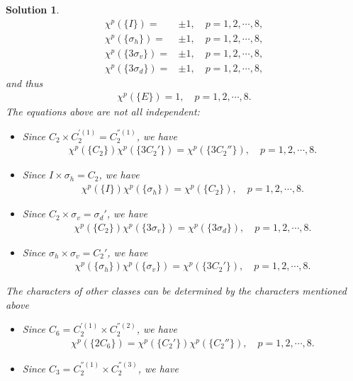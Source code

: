 \documentclass[UTF8,10pt,a4paper]{article}
\theoremstyle{Problem}
\theoremstyle{Solution}
\newtheorem*{sol}{Solution}
\begin{document}
\begin{sol}
\begin{align}
        \chi^p(\{I\})=&\pm 1,\quad p=1,2,\cdots,8,\\
        \chi^p(\{\sigma_h\})=&\pm 1,\quad p=1,2,\cdots,8,\\
        \chi^p(\{3\sigma_v\})=&\pm 1,\quad p=1,2,\cdots,8,\\
        \chi^p(\{3\sigma_d\})=&\pm 1,\quad p=1,2,\cdots,8,
    \end{align}
    and thus
    \begin{align}
        \chi^p(\{E\})=1,\quad p=1,2,\cdots,8.
    \end{align}
    The equations above are not all independent:
    \begin{itemize}
        \item Since $C_2\times C_2^{'(1)}=C_2^{''(1)}$, we have
        \begin{align}
            \chi^p(\{C_2\})\chi^p(\{3C_2'\})=\chi^p(\{3C_2''\}),\quad p=1,2,\cdots,8.
        \end{align}
        \item Since $I\times \sigma_h=C_2$, we have
        \begin{align}
            \chi^p(\{I\})\chi^p(\{\sigma_h\})=\chi^p(\{C_2\}),\quad p=1,2,\cdots,8.
        \end{align}
        \item Since $C_2\times\sigma_v=\sigma_d'$, we have
        \begin{align}
            \chi^p(\{C_2\})\chi^p(\{3\sigma_v\})=\chi^p(\{3\sigma_d\}),\quad p=1,2,\cdots,8.
        \end{align}
        \item Since $\sigma_h\times\sigma_v=C_2'$, we have
        \begin{align}
            \chi^p(\{\sigma_h\})\chi^p(\{\sigma_v\})=\chi^p(\{3C_2'\}),\quad p=1,2,\cdots,8.
        \end{align}
    \end{itemize}
    The characters of other classes can be determined by the characters mentioned above
    \begin{itemize}
        \item Since $C_6=C_2^{'(1)}\times C_2^{''(2)}$, we have
        \begin{align}
            \chi^p(\{2C_6\})=\chi^p(\{C_2'\})\chi^p(\{C_2''\}),\quad p=1,2,\cdots,8.
        \end{align}
        \item Since $C_3=C_2^{''(1)}\times C_2^{''(3)}$, we have
        \begin{align}

\end{align}
\end{itemize}
\end{sol}
\end{document}
